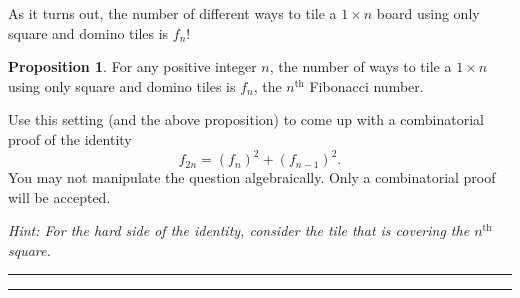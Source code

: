 \documentclass{article}
\theoremstyle{definition}
\newtheorem*{proposition}{Proposition} %
\newenvironment{solution}{\bigskip\hrule{\hfill}}{\bigskip\hrule{\hfill}} %
\begin{document}
\noindent As it turns out, the number of different ways to tile a $1\times n$ board using only square and domino tiles is $f_n$! 
\begin{proposition}
    For any positive integer $n$, the number of ways to tile a $1\times n$ using only square and domino tiles is $f_n$, the $n^{\text{th}}$ Fibonacci number.
\end{proposition}

\bigskip

\noindent Use this setting (and the above proposition) to come up with a combinatorial proof of the identity $$f_{2n}=\left(f_n\right)^2+\left(f_{n-1}\right)^2.$$ You may not manipulate the question algebraically. Only a combinatorial proof will be accepted. \bigskip

\noindent \emph{Hint: For the hard side of the identity, consider the tile that is covering the $n^\text{th}$ square.}
\begin{solution}



\end{solution}

\end{document}
